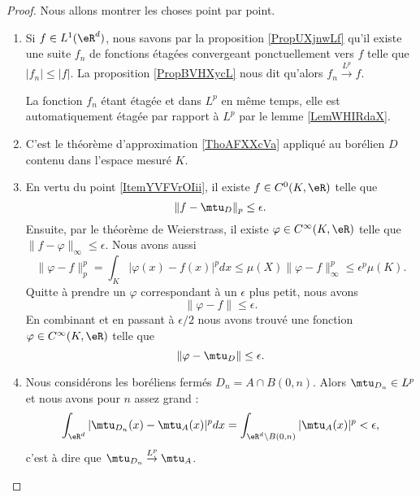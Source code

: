 \begin{proof}
   Nous allons montrer les choses point par point.
   \begin{enumerate}
       \item
           Si \( f\in L^1(\eR^d)\), nous savons par la proposition \ref{PropUXjnwLf} qu'il existe une suite \( f_n\) de fonctions étagées convergeant ponctuellement vers \( f\) telle que \( | f_n |\leq | f |\). La proposition \ref{PropBVHXycL} nous dit qu'alors \( f_n\stackrel{L^p}{\to}f\).

           La fonction \( f_n\) étant étagée et dans \( L^p\) en même temps, elle est automatiquement étagée par rapport à \( L^p\) par le lemme \ref{LemWHIRdaX}.

       \item\label{ItemYVFVrOIi}

           C'est le théorème d'approximation \ref{ThoAFXXcVa} appliqué au borélien \( D\) contenu dans l'espace mesuré \( K\).

       \item

           En vertu du point \ref{ItemYVFVrOIii}, il existe \( f\in C^0(K,\eR)\) telle que
           \begin{equation}
             \| f-\mtu_D \|_p\leq \epsilon.
           \end{equation}
           Ensuite, par le théorème de Weierstrass, il existe \( \varphi\in C^{\infty}(K,\eR)\) telle que \( \| f-\varphi \|_{\infty}\leq \epsilon\). Nous avons aussi
           \begin{equation}
               \| \varphi-f \|^p_p=\int_K| \varphi(x)-f(x) |^pdx\leq\mu(X)\| \varphi-f \|_{\infty}^p\leq \epsilon^p\mu(K).
           \end{equation}
           Quitte à prendre un \( \varphi\) correspondant à un \( \epsilon\) plus petit, nous avons
           \begin{equation}
               \| \varphi-f \|\leq \epsilon.
           \end{equation}
           En combinant et en passant à \( \epsilon/2\) nous avons trouvé une fonction \( \varphi\in  C^{\infty}(K,\eR)\) telle que
           \begin{equation}
               \| \varphi-\mtu_D \|\leq \epsilon.
           \end{equation}

       \item

           Nous considérons les boréliens fermés \( D_n=A\cap B(0,n)\). Alors \( \mtu_{D_n}\in L^p\) et nous avons pour \( n\) assez grand :
           \begin{equation}
               \int_{\eR^d}| \mtu_{D_n}(x)-\mtu_{A}(x) |^pdx=\int_{\eR^d\setminus B(0,n)}| \mtu_A(x) |^p<\epsilon,
           \end{equation}
           c'est à dire que \( \mtu_{D_n}\stackrel{L^p}{\to}\mtu_A\).


\end{enumerate}
\end{proof}
